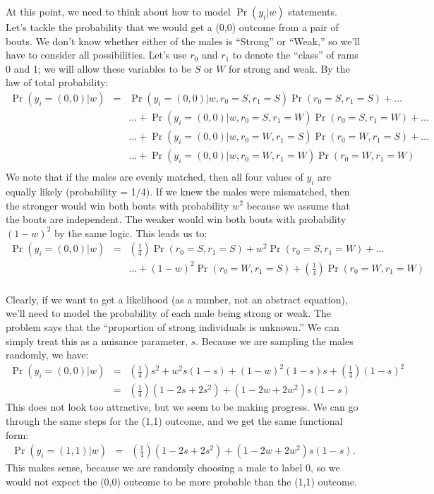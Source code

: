 \documentclass[11pt]{article}
\begin{document}
At this point, we need to think about how to model $\Pr(y_i|w)$ statements.
Let's tackle the probability that we would get a (0,0) outcome from a pair of bouts.
We don't know whether either of the males is ``Strong'' or ``Weak,'' so we'll have to consider all possibilities.
Let's use $r_0$ and $r_1$ to denote the ``class'' of rams 0 and 1; we will allow these variables to be $S$ or $W$ for strong and weak.
By the law of total probability:
\begin{eqnarray*} 
 \Pr(y_i = (0,0)|w)  & = & \Pr(y_i = (0,0)|w,r_0=S,r_1=S)\Pr(r_0=S,r_1=S) + \ldots \\
 & & \ldots + \Pr(y_i = (0,0)|w,r_0=S,r_1=W)\Pr(r_0=S,r_1=W) + \ldots \\
 & & \ldots + \Pr(y_i = (0,0)|w,r_0=W,r_1=S)\Pr(r_0=W,r_1=S) + \ldots \\
 & & \ldots + \Pr(y_i = (0,0)|w,r_0=W,r_1=W)\Pr(r_0=W,r_1=W) \\
\end{eqnarray*}
We note that if the males are evenly matched, then all four values of $y_i$ are equally likely (probability = 1/4).
If we knew the males were mismatched, then the stronger would win both bouts with probability $w^2$ because we assume that the bouts are independent.
The weaker would win both bouts with probability $(1-w)^2$ by the same logic. This leads us to:
\begin{eqnarray*} 
 \Pr(y_i = (0,0)|w)  & = &   \left(\frac{1}{4}\right)\Pr(r_0=S,r_1=S) + w^2 \Pr(r_0=S,r_1=W) + \ldots \\
 &  & \ldots + (1-w)^2\Pr(r_0=W,r_1=S) + \left(\frac{1}{4}\right)\Pr(r_0=W,r_1=W) \\
\end{eqnarray*}

Clearly, if we want to get a likelihood (as a number, not an abstract equation), we'll need to model the probability of each male being strong or weak. 
The problem says that the ``proportion of strong individuals is unknown.''
We can simply treat this as a nuisance parameter, $s$.
Because we are sampling the males randomly, we have:
\begin{eqnarray*} 
 \Pr(y_i = (0,0)|w)  & = &   \left(\frac{1}{4}\right)s^2 + w^2 s(1-s)  + (1-w)^2(1-s)s + \left(\frac{1}{4}\right)(1-s)^2 \\
	 & = &   \left(\frac{1}{4}\right)(1-2s +2s^2) + (1 -2w +2w^2) s(1-s)
\end{eqnarray*}
This does not look too attractive, but we seem to be making progress. We can go through the same steps for the (1,1) outcome, and we get the same functional form:
\begin{eqnarray*} 
 \Pr(y_i = (1,1)|w)  & = &   \left(\frac{1}{4}\right)(1-2s +2s^2) + (1 -2w +2w^2) s(1-s).
\end{eqnarray*}
This makes sense, because we are randomly choosing a male to label 0, so we would not expect the (0,0) outcome to be more probable than the (1,1) outcome.
\end{document}

